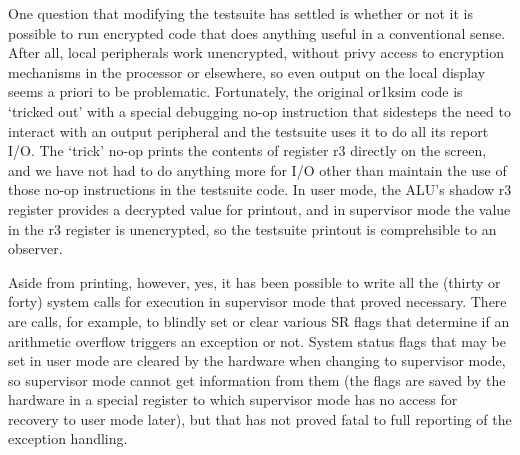 \documentclass[conference]{IEEEtran}
\begin{document}
One question that modifying the testsuite has settled is whether or not
it is possible to run encrypted code that does anything useful in a
conventional sense.  After all, local peripherals work unencrypted,
without privy access to encryption mechanisms in the processor or
elsewhere, so even output on the local display seems a priori to be
problematic.  Fortunately, the original or1ksim code is `tricked out'
with a special debugging no-op instruction that sidesteps the need to
interact with an output peripheral and the testsuite uses it to do all
its report I/O.  The `trick' no-op prints the contents of register r3
directly on the screen, and we have not had to do anything more for I/O
other than maintain the use of those no-op instructions in the testsuite
code.  In user mode, the ALU's shadow r3 register provides a decrypted
value for printout, and in supervisor mode the value in the r3 register
is unencrypted, so the testsuite printout is comprehsible to an
observer.

Aside from printing, however, yes, it has been possible to write all the
(thirty or forty) system calls for execution in supervisor mode that
proved necessary.  There are calls, for example, to blindly set or clear
various SR flags that determine if an
arithmetic overflow triggers an exception or not.  System status flags
that may be set in user mode are cleared by the hardware when
changing to supervisor mode, so supervisor mode cannot get information
from them (the flags are saved by the hardware in a special register
to which supervisor mode has no access for recovery to user mode later),
but that has not proved fatal to full reporting of the exception
handling.
\end{document}
